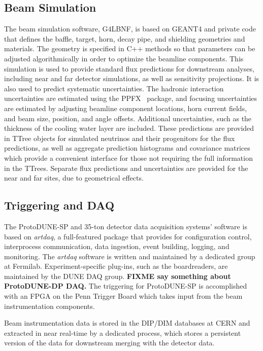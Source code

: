 \subsection{Beam Simulation}

The beam simulation software, G4LBNF, is based on GEANT4 and private code that defines the baffle, target, horn,
decay pipe, and shielding geometries and materials.  The geometry is specified in C++ methods so that parameters
can be adjusted algorithmically in order to optimize the beamline components.  This simulation is used to provide
standard flux predictions for downstream analyses, including near and far detector simulations, as well as
sensitivity projections.  It is also used to predict systematic uncertainties.  The hadronic interaction uncertainties
are estimated using the PPFX~\cite{AliagaSoplin:2016shs} package, and focusing uncertainties are estimated by adjusting 
beamline component locations, horn current fields, and beam size, position, and angle offsets.  Additional
uncertainties, such as the thickness of the cooling water layer are included.  These predictions are provided
in TTree objects for simulated neutrinos and their progenitors for the flux predictions, as well as aggregate
prediction histograms and covariance matrices which provide a convenient interface for those not requiring the
full information in the TTrees.  Separate flux predictions and uncertainties are provided for the near and far
sites, due to geometrical effects.

\subsection{Triggering and DAQ}

The ProtoDUNE-SP and 35-ton detector data acquisition systems'
software is based on {\it artdaq}, a full-featured package that provides
for configuration control, interprocess communication, data ingestion, event building, logging, and monitoring.
The {\it artdaq} software is written and maintained by a dedicated group at Fermilab.  Experiment-specific plug-ins,
such as the boardreaders, are maintained by the DUNE DAQ group.  {\bf FIXME say something about ProtoDUNE-DP DAQ.}
The triggering for ProtoDUNE-SP is accomplished with an FPGA on the Penn Trigger Board which takes input from
the beam instrumentation components. 

Beam instrumentation data is stored in the DIP/DIM databases at CERN and extracted in near real-time by a dedicated
process, which stores a persistent version of the data for downstream merging with the detector data.

